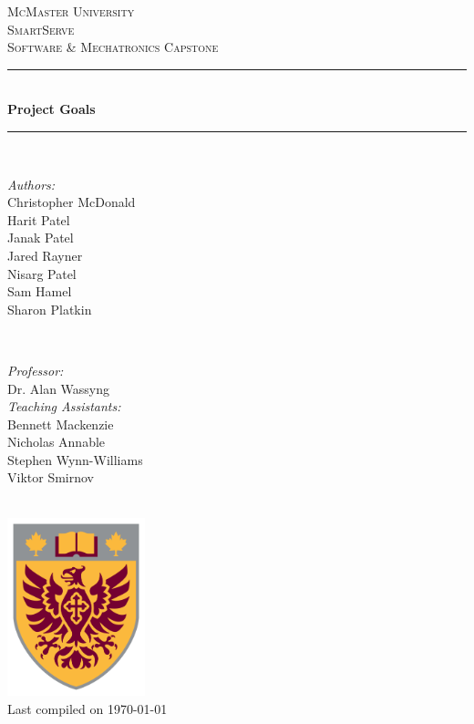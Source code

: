 \documentclass[11pt]{article}
\begin{document}
\begin{titlepage}
	\newcommand{\HRule}{\rule{\linewidth}{0.2mm}}
	\begin{center}
	\textsc{\LARGE McMaster University}\\[1.5cm]
	
	\textsc{\Large SmartServe}\\[0.5cm]
	\textsc{\large Software \& Mechatronics Capstone}\\[0.5cm] 

	\HRule\\[0.4cm]
		{\huge\bfseries Project Goals}\\[0.4cm]
	\HRule\\[0.4cm]
	
	\begin{minipage}[t][][t]{0.5\textwidth}
		\begin{flushleft} \large
			\emph{Authors:}\\
			Christopher McDonald\\
			Harit Patel \\
			Janak Patel \\
			Jared Rayner  \\
			Nisarg Patel  \\
			Sam Hamel \\
			Sharon Platkin \\
		\end{flushleft}
	\end{minipage}
	~
	\begin{minipage}[t][][t]{0.4\textwidth}
		\begin{flushright} \large
			\emph{Professor:} \\
			Dr. Alan Wassyng \\[0.4cm]
			\emph{Teaching Assistants:} \\
			Bennett Mackenzie \\ 
			Nicholas Annable \\ 
			Stephen Wynn-Williams \\ 
			Viktor Smirnov
		\end{flushright}
	\end{minipage}\\[2cm]
	
	\includegraphics[width=0.3\textwidth]{logo.png} \\
	{\large Last compiled on \today}
	\end{center}

\end{titlepage}
\end{document}
